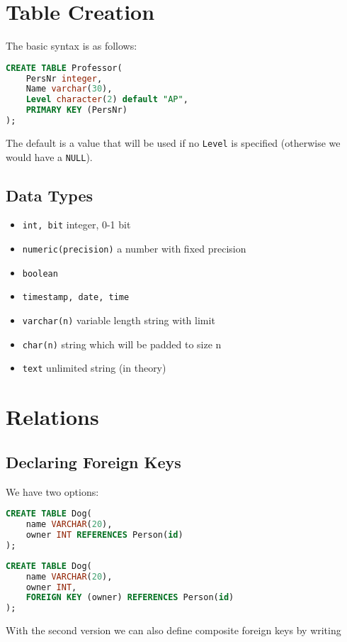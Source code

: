 \documentclass{sciposter}
\renewcommand{\t}[1]{\texttt{#1}}
\begin{document}
\begin{multicols}{3}
\section*{Table Creation}
The basic syntax is as follows:
\begin{lstlisting}[language=SQL]
CREATE TABLE Professor(
	PersNr integer,
	Name varchar(30),
	Level character(2) default "AP",
	PRIMARY KEY (PersNr)
);
\end{lstlisting}
The default is a value that will be used if no \t{Level} is specified (otherwise we would have a \t{NULL}).

\subsection*{Data Types}

\begin{itemize}
	\item \t{int, bit} integer, 0-1 bit
	\item \t{numeric(precision)} a number with fixed precision
	\item \t{boolean} 
	\item \t{timestamp, date, time}
	\item \t{varchar(n)} variable length string with limit
	\item \t{char(n)} string which will be padded to size n
	\item \t{text} unlimited string (in theory)
\end{itemize}

\section*{Relations}

\subsection*{Declaring Foreign Keys}

We have two options:
\begin{lstlisting}[language=SQL]
CREATE TABLE Dog(
	name VARCHAR(20),
	owner INT REFERENCES Person(id)
);
\end{lstlisting}

\begin{lstlisting}[language=SQL]
CREATE TABLE Dog(
	name VARCHAR(20),
	owner INT,
	FOREIGN KEY (owner) REFERENCES Person(id)
);
\end{lstlisting}

With the second version we can also define composite foreign keys by writing


\end{multicols}
\end{document}
